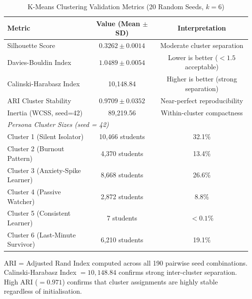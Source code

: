 
\begin{table}[!t]
  \renewcommand{\arraystretch}{1.25}
  \caption{K-Means Clustering Validation Metrics (20 Random Seeds, $k=6$)}
  \label{tab:cluster_validation}
  \centering
  \begin{tabular}{lcc}
    \hline
    \textbf{Metric} & \textbf{Value (Mean $\pm$ SD)} & \textbf{Interpretation} \\
    \hline
    Silhouette Score           & $0.3262 \pm 0.0014$ & Moderate cluster separation \\
    Davies-Bouldin Index       & $1.0489 \pm 0.0054$ & Lower is better ($<1.5$ acceptable) \\
    Calinski-Harabasz Index    & 10,148.84           & Higher is better (strong separation) \\
    ARI Cluster Stability      & $0.9709 \pm 0.0352$ & Near-perfect reproducibility \\
    Inertia (WCSS, seed=42)    & 89,219.56           & Within-cluster compactness \\
    \hline
    \multicolumn{3}{l}{\textit{Persona Cluster Sizes (seed = 42)}} \\
    \hline
    Cluster 1 (Silent Isolator)       & 10,466 students & 32.1\% \\
    Cluster 2 (Burnout Pattern)       & 4,370 students  & 13.4\% \\
    Cluster 3 (Anxiety-Spike Learner) & 8,668 students  & 26.6\% \\
    Cluster 4 (Passive Watcher)       & 2,872 students  & 8.8\% \\
    Cluster 5 (Consistent Learner)    & 7 students      & $< 0.1$\% \\
    Cluster 6 (Last-Minute Survivor)  & 6,210 students  & 19.1\% \\
    \hline
  \end{tabular}
  \vspace{1mm}
  \begin{flushleft}
    \small ARI = Adjusted Rand Index computed across all 190 pairwise seed combinations.
    Calinski-Harabasz Index $= 10{,}148.84$ confirms strong inter-cluster separation.
    High ARI ($= 0.971$) confirms that cluster assignments are highly stable
    regardless of initialisation.
  \end{flushleft}
\end{table}


